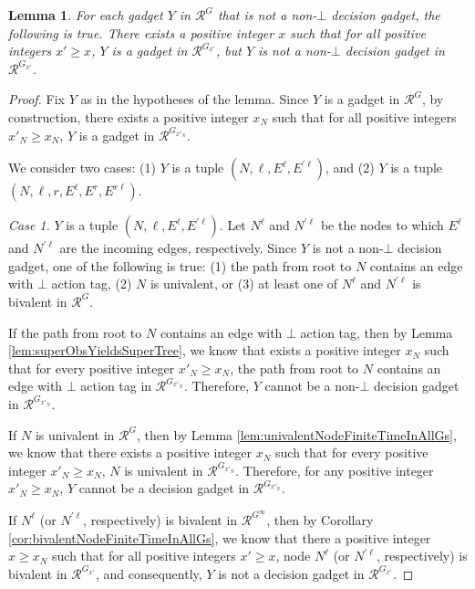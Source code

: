 \documentclass[11pt]{article}
\numberwithin{theorem}{section}
\newtheorem{lemma}[theorem]{Lemma}
\begin{document}
\begin{lemma}\label{lem:nonDecisionGadgetStableInAllGs}
For each gadget $Y$ in $\mathcal{R}^{G}$ that is not a non-$\bot$ decision gadget, the following is true.
 There exists a positive integer $x$ such that for all positive integers $x' \geq x$, $Y$ is a gadget in $\mathcal{R}^{G_{x'}}$, but $Y$ is not a non-$\bot$ decision gadget in $\mathcal{R}^{G_{x'}}$.
\end{lemma}
\begin{proof}
Fix $Y$ as in the hypotheses of the lemma. Since $Y$ is a gadget in $\mathcal{R}^{G}$, by construction, there exists a positive integer $x_N$ such that for all positive integers $x'_N \geq x_N$, $Y$ is a gadget in $\mathcal{R}^{G_{x'_N}}$. 

We consider two cases: (1) $Y$ is a tuple $(N,\ell,E^\ell,E^{\prime \ell})$, and (2) $Y$ is a tuple $(N,\ell,r,E^\ell,E^r,E^{r\ell})$.

\emph{Case 1.} $Y$ is a tuple $(N,\ell,E^\ell,E^{\prime \ell})$. 
Let $N^\ell$ and $N^{\prime \ell}$ be the nodes to which $E^\ell$ and $N^{\prime \ell}$ are the incoming edges, respectively.
Since $Y$ is not a non-$\bot$ decision gadget, one of the following is true: (1) the path from root to $N$ contains an edge with $\bot$ action tag, (2) $N$ is univalent,  or (3) at least one of $N^\ell$ and $N^{\prime \ell}$ is bivalent in $\mathcal{R}^{G}$. 

If the path from root to $N$ contains an edge with $\bot$ action tag, then by Lemma \ref{lem:superObsYieldsSuperTree}, we know that  exists a positive integer $x_N$ such that for every positive integer $x'_N \geq x_N$, the path from root to $N$ contains an edge with $\bot$ action tag in $\mathcal{R}^{G_{x'_N}}$. Therefore, $Y$ cannot be a non-$\bot$ decision gadget in $\mathcal{R}^{G_{x'_N}}$.


If $N$ is univalent in $\mathcal{R}^{G}$, then by Lemma \ref{lem:univalentNodeFiniteTimeInAllGs}, we know that there exists a positive integer $x_N$ such that for every positive integer $x'_N \geq x_N$, $N$ is univalent in $\mathcal{R}^{G_{x'_N}}$. Therefore, for any positive integer $x'_N \geq x_N$, $Y$ cannot be a decision gadget in $\mathcal{R}^{G_{x'_N}}$.

If $N^\ell$ (or $N^{\prime \ell}$, respectively) is bivalent in $\mathcal{R}^{G^\infty}$, then by Corollary \ref{cor:bivalentNodeFiniteTimeInAllGs}, we know that there a positive integer $x \geq x_N$ such that for all positive integers $x' \geq x$, node $N^\ell$ (or $N^{\prime \ell}$, respectively) is bivalent in $\mathcal{R}^{G_{x'}}$, and consequently, $Y$ is not a decision gadget in $\mathcal{R}^{G_{x'}}$. 


\end{proof}
\end{document}
